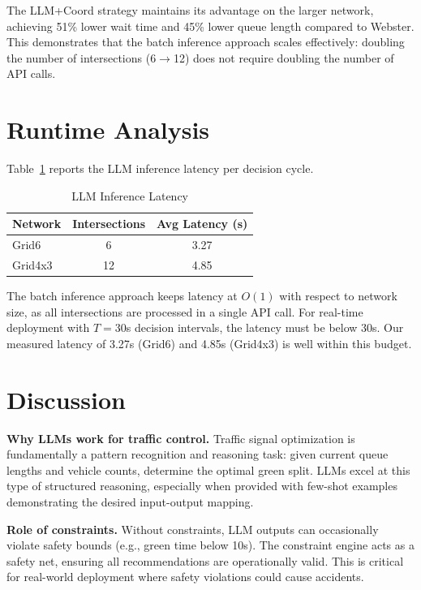 \documentclass[conference]{IEEEtran}
\begin{document}
The LLM+Coord strategy maintains its advantage on the larger network, achieving 51\% lower wait time and 45\% lower queue length compared to Webster. This demonstrates that the batch inference approach scales effectively: doubling the number of intersections (6$\rightarrow$12) does not require doubling the number of API calls.

\section{Runtime Analysis}
\label{sec:runtime}

Table~\ref{tab:runtime} reports the LLM inference latency per decision cycle.

\begin{table}[htbp]
\centering
\caption{LLM Inference Latency}
\label{tab:runtime}
\begin{tabular}{lcc}
\toprule
\textbf{Network} & \textbf{Intersections} & \textbf{Avg Latency (s)} \\
\midrule
Grid6 & 6 & 3.27 \\
Grid4x3 & 12 & 4.85 \\
\bottomrule
\end{tabular}
\end{table}

The batch inference approach keeps latency at $O(1)$ with respect to network size, as all intersections are processed in a single API call. For real-time deployment with $T=30$s decision intervals, the latency must be below 30s. Our measured latency of 3.27s (Grid6) and 4.85s (Grid4x3) is well within this budget.


\section{Discussion}
\label{sec:discussion}

\textbf{Why LLMs work for traffic control.} Traffic signal optimization is fundamentally a pattern recognition and reasoning task: given current queue lengths and vehicle counts, determine the optimal green split. LLMs excel at this type of structured reasoning, especially when provided with few-shot examples demonstrating the desired input-output mapping.

\textbf{Role of constraints.} Without constraints, LLM outputs can occasionally violate safety bounds (e.g., green time below 10s). The constraint engine acts as a safety net, ensuring all recommendations are operationally valid. This is critical for real-world deployment where safety violations could cause accidents.
\end{document}
